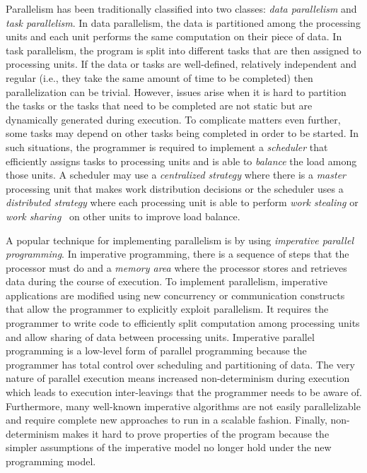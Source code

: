 Parallelism has been traditionally classified into two classes: \emph{data
parallelism} and \emph{task parallelism}. In data parallelism, the data is
partitioned among the processing units and each unit performs the same
computation on their piece of data. In task parallelism, the program is split
into different tasks that are then assigned to processing units. If the data or
tasks are well-defined, relatively independent and regular (i.e., they take the
same amount of time to be completed) then parallelization can be trivial.
However, issues arise when it is hard to partition the tasks or the tasks that
need to be completed are not static but are dynamically generated during
execution. To complicate matters even further, some tasks may depend on other
tasks being completed in order to be started. In such situations, the programmer
is required to implement a \emph{scheduler} that efficiently assigns tasks to
processing units and is able to \emph{balance} the load among those units. A
scheduler may use a \emph{centralized strategy} where there is a \emph{master}
processing unit that makes work distribution decisions or the scheduler uses a
\emph{distributed strategy} where each processing unit is able to perform
\emph{work stealing} or \emph{work sharing}~\cite{Blumofe:1999} on other units
to improve load balance.

A popular technique for implementing parallelism is by using \emph{imperative
parallel programming}. In imperative programming, there is a
sequence of steps that the processor must do and a \emph{memory area} where the
processor stores and retrieves data during the course of execution. To implement
parallelism, imperative applications are modified using new concurrency or
communication constructs that allow the programmer to explicitly exploit
parallelism. It requires the programmer to write code to efficiently split
computation among processing units and allow sharing of data between processing
units. Imperative parallel
programming is a low-level form of parallel programming because the programmer has total control over
scheduling and partitioning of data. The very nature of parallel execution means
increased non-determinism during execution which leads to execution
inter-leavings that the programmer needs to be aware of.  Furthermore, many
well-known imperative algorithms are not easily parallelizable and require
complete new approaches to run in a scalable fashion. Finally, non-determinism
makes it hard to prove properties of the program because the simpler assumptions
of the imperative model no longer hold under the new programming model.

